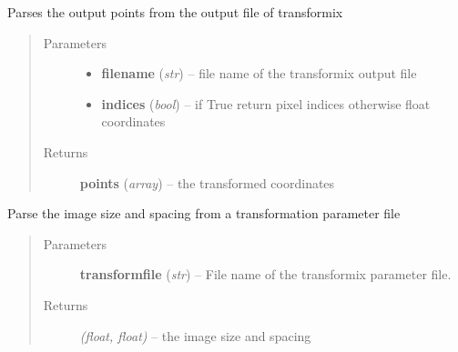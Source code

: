 \documentclass[letterpaper,10pt,english]{sphinxmanual}
\begin{document}

\begin{fulllineitems}
\label{api/ClearMap.Alignment:ClearMap.Alignment.Elastix.parseElastixOutputPoints}
Parses the output points from the output file of transformix
\begin{quote}\begin{description}
\item[{Parameters}] \leavevmode\begin{itemize}
\item {} 
\textbf{filename} (\emph{str}) --
file name of the transformix output file

\item {} 
\textbf{indices} (\emph{bool}) --
if True return pixel indices otherwise float coordinates

\end{itemize}

\item[{Returns}] \leavevmode
\textbf{points} (\emph{array}) --
the transformed coordinates

\end{description}\end{quote}

\end{fulllineitems}


\begin{fulllineitems}
\label{api/ClearMap.Alignment:ClearMap.Alignment.Elastix.getTransformFileSizeAndSpacing}
Parse the image size and spacing from a transformation parameter file
\begin{quote}\begin{description}
\item[{Parameters}] \leavevmode
\textbf{transformfile} (\emph{str}) --
File name of the transformix parameter file.

\item[{Returns}] \leavevmode
\emph{(float, float)} --
the image size and spacing

\end{description}\end{quote}

\end{fulllineitems}
\end{document}
